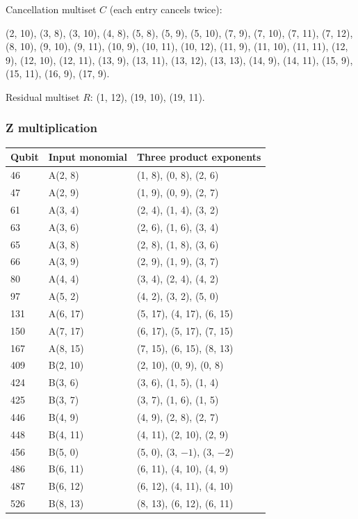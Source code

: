 \documentclass{article}
\begin{document}
Cancellation multiset \(C\) (each entry cancels twice):

(2, 10), (3, 8), (3, 10), (4, 8), (5, 8), (5, 9), (5, 10), (7, 9), (7, 10), (7, 11), (7, 12),
(8, 10), (9, 10), (9, 11), (10, 9), (10, 11), (10, 12), (11, 9), (11, 10), (11, 11), (12, 9),
(12, 10), (12, 11), (13, 9), (13, 11), (13, 12), (13, 13), (14, 9), (14, 11), (15, 9), (15, 11),
(16, 9), (17, 9).

Residual multiset \(R\): (1, 12), (19, 10), (19, 11).

\subsubsection{Z multiplication}\label{sec:z-multiplication}

\begin{longtable}{lll}
  Qubit & Input monomial & Three product exponents \\
  \hline
  \endhead
  46 & A(2, 8) & (1, 8), (0, 8), (2, 6) \\
  47 & A(2, 9) & (1, 9), (0, 9), (2, 7) \\
  61 & A(3, 4) & (2, 4), (1, 4), (3, 2) \\
  63 & A(3, 6) & (2, 6), (1, 6), (3, 4) \\
  65 & A(3, 8) & (2, 8), (1, 8), (3, 6) \\
  66 & A(3, 9) & (2, 9), (1, 9), (3, 7) \\
  80 & A(4, 4) & (3, 4), (2, 4), (4, 2) \\
  97 & A(5, 2) & (4, 2), (3, 2), (5, 0) \\
  131 & A(6, 17) & (5, 17), (4, 17), (6, 15) \\
  150 & A(7, 17) & (6, 17), (5, 17), (7, 15) \\
  167 & A(8, 15) & (7, 15), (6, 15), (8, 13) \\
  409 & B(2, 10) & (2, 10), (0, 9), (0, 8) \\
  424 & B(3, 6) & (3, 6), (1, 5), (1, 4) \\
  425 & B(3, 7) & (3, 7), (1, 6), (1, 5) \\
  446 & B(4, 9) & (4, 9), (2, 8), (2, 7) \\
  448 & B(4, 11) & (4, 11), (2, 10), (2, 9) \\
  456 & B(5, 0) & (5, 0), (3, \(-1\)), (3, \(-2\)) \\
  486 & B(6, 11) & (6, 11), (4, 10), (4, 9) \\
  487 & B(6, 12) & (6, 12), (4, 11), (4, 10) \\
  526 & B(8, 13) & (8, 13), (6, 12), (6, 11) \\
\end{longtable}
\end{document}
